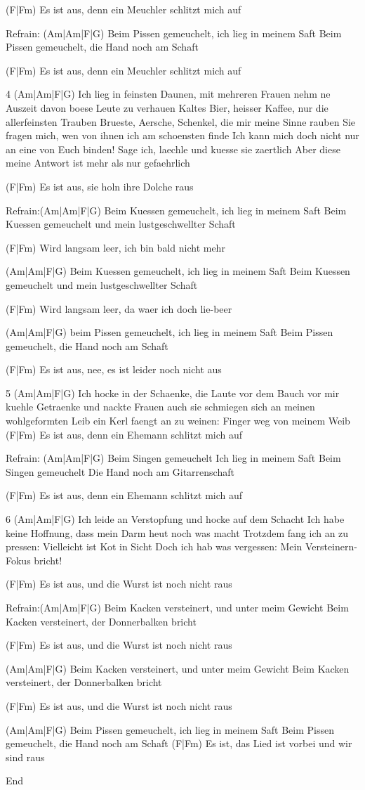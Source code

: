(F|Fm)
Es ist aus, denn ein Meuchler schlitzt mich auf


Refrain: (Am|Am|F|G)
Beim Pissen gemeuchelt, ich lieg in meinem Saft
Beim Pissen gemeuchelt, die Hand noch am Schaft

(F|Fm)
Es ist aus, denn ein Meuchler schlitzt mich auf


4 (Am|Am|F|G)
Ich lieg in feinsten Daunen, mit mehreren Frauen
nehm ne Auszeit davon boese Leute zu verhauen
Kaltes Bier, heisser Kaffee, nur die allerfeinsten Trauben
Brueste, Aersche, Schenkel, die mir meine Sinne rauben
Sie fragen mich, wen von ihnen ich am schoensten finde
Ich kann mich doch nicht nur an eine von Euch binden!
Sage ich, laechle und kuesse sie zaertlich
Aber diese meine Antwort ist mehr als nur gefaehrlich

(F|Fm)
Es ist aus, sie holn ihre Dolche raus


Refrain:(Am|Am|F|G)
Beim Kuessen gemeuchelt, ich lieg in meinem Saft
Beim Kuessen gemeuchelt und mein lustgeschwellter Schaft

(F|Fm)
Wird langsam leer, ich bin bald nicht mehr

(Am|Am|F|G)
Beim Kuessen gemeuchelt, ich lieg in meinem Saft
Beim Kuessen gemeuchelt und mein lustgeschwellter Schaft

(F|Fm)
Wird langsam leer, da waer ich doch lie-beer

(Am|Am|F|G)
beim Pissen gemeuchelt, ich lieg in meinem Saft
Beim Pissen gemeuchelt, die Hand noch am Schaft

(F|Fm)
Es ist aus, nee, es ist leider noch nicht aus


5 (Am|Am|F|G)
Ich hocke in der Schaenke, die Laute vor dem Bauch
vor mir kuehle Getraenke und nackte Frauen auch
sie schmiegen sich an meinen wohlgeformten Leib
ein Kerl faengt an zu weinen: Finger weg von meinem Weib
(F|Fm)
Es ist aus, denn ein Ehemann schlitzt mich auf


Refrain: (Am|Am|F|G)
Beim Singen gemeuchelt
Ich lieg in meinem Saft
Beim Singen gemeuchelt
Die Hand noch am Gitarrenschaft

(F|Fm)
Es ist aus, denn ein Ehemann schlitzt mich auf


6 (Am|Am|F|G)
Ich leide an Verstopfung und hocke auf dem Schacht
Ich habe keine Hoffnung, dass mein Darm heut noch was macht
Trotzdem fang ich an zu pressen: Vielleicht ist Kot in Sicht
Doch ich hab was vergessen: Mein Versteinern-Fokus bricht!

(F|Fm)
Es ist aus, und die Wurst ist noch nicht raus


Refrain:(Am|Am|F|G)
Beim Kacken versteinert, und unter meim Gewicht
Beim Kacken versteinert, der Donnerbalken bricht

(F|Fm)
Es ist aus, und die Wurst ist noch nicht raus

(Am|Am|F|G)
Beim Kacken versteinert, und unter meim Gewicht
Beim Kacken versteinert, der Donnerbalken bricht

(F|Fm)
Es ist aus, und die Wurst ist noch nicht raus

(Am|Am|F|G)
Beim Pissen gemeuchelt, ich lieg in meinem Saft
Beim Pissen gemeuchelt, die Hand noch am Schaft
(F|Fm)
Es ist, das Lied ist vorbei und wir sind raus

End
